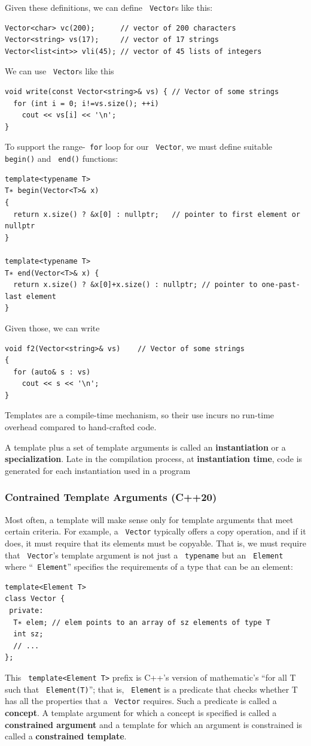 \documentclass[11pt]{article}
\let\OldTexttt\texttt
\renewcommand{\texttt}[1]{\OldTexttt{\color{MidnightBlue} #1}}
\begin{document}
Given these definitions, we can define \texttt{Vector}s like this:
\begin{verbatim}
Vector<char> vc(200);      // vector of 200 characters
Vector<string> vs(17);     // vector of 17 strings
Vector<list<int>> vli(45); // vector of 45 lists of integers
\end{verbatim}

We can use \texttt{Vector}s like this
\begin{verbatim}
void write(const Vector<string>& vs) { // Vector of some strings
  for (int i = 0; i!=vs.size(); ++i)
    cout << vs[i] << '\n';
}
\end{verbatim}

To support the range-\texttt{for} loop for our \texttt{Vector}, we must define suitable \texttt{begin()} and \texttt{end()}
functions:
\begin{verbatim}
template<typename T>
T∗ begin(Vector<T>& x)
{
  return x.size() ? &x[0] : nullptr;   // pointer to first element or nullptr
}

template<typename T>
T∗ end(Vector<T>& x) {
  return x.size() ? &x[0]+x.size() : nullptr; // pointer to one-past-last element
}
\end{verbatim}

Given those, we can write
\begin{verbatim}
void f2(Vector<string>& vs)    // Vector of some strings
{
  for (auto& s : vs)
    cout << s << '\n';
}
\end{verbatim}

Templates are a compile-time mechanism, so their use incurs no run-time overhead compared to
hand-crafted code.

A template plus a set of template arguments is called an \textbf{instantiation} or a \textbf{specialization}. Late
in the compilation process, at \textbf{instantiation time}, code is generated for each instantiation used
in a program
\subsubsection{Contrained Template Arguments (C++20)}
\label{sec:org3e76642}
Most often, a template will make sense only for template arguments that meet certain criteria.
For example, a \texttt{Vector} typically offers a copy operation, and if it does, it must require that
its elements must be copyable. That is, we must require that \texttt{Vector}'s template argument is not
just a \texttt{typename} but an \texttt{Element} where ``\texttt{Element}'' specifies the requirements of a type that can
be an element:
\begin{verbatim}
template<Element T>
class Vector {
 private:
  T∗ elem; // elem points to an array of sz elements of type T
  int sz;
  // ...
};
\end{verbatim}
This \texttt{template<Element T>} prefix is C++'s version of mathematic's ``for all T such that
\texttt{Element(T)}''; that is, \texttt{Element} is a predicate that checks whether T has all the properties that
a \texttt{Vector} requires. Such a predicate is called a \textbf{concept}. A template argument for which a concept
is specified is called a \textbf{constrained argument} and a template for which an argument is
constrained is called a \textbf{constrained template}.
\end{document}
